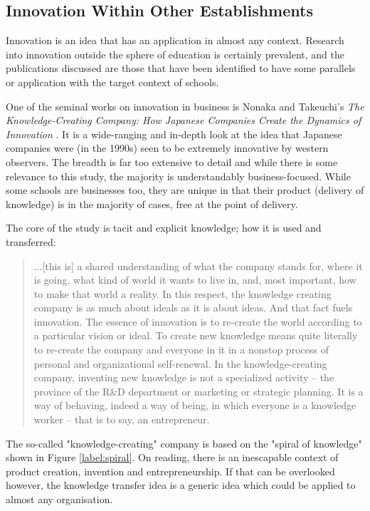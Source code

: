 \subsection{Innovation Within Other Establishments}
Innovation is an idea that has an application in almost any context. Research into innovation outside the sphere of education is certainly prevalent, and the publications discussed are those that have been identified to have some parallels or application with the target context of schools.

One of the seminal works on innovation in business is Nonaka and Takeuchi's \textit{The Knowledge-Creating Company: How Japanese Companies Create the Dynamics of Innovation} \citet{nonaka1995knowledge}. It is a wide-ranging and in-depth look at the idea that Japanese companies were (in the 1990s) seen to be extremely innovative by western observers. The breadth is far too extensive to detail and while there is some relevance to this study, the majority is understandably business-focused. While some schools are businesses too, they are unique in that their product (delivery of knowledge) is in the majority of cases, free at the point of delivery.

The core of the study is tacit and explicit knowledge; how it is used and transferred:

\begin{quote}
...[this is] a shared understanding of what the company stands for, where it is going, what kind of world it wants to live in, and, most important, how to make that world a reality. In this respect, the knowledge creating company is as much about ideals as it is about ideas. And that fact fuels innovation. The essence of innovation is to re-create the world according to a particular vision or ideal. To create new knowledge means quite literally to re-create the company and everyone in it in a nonstop process of personal and organizational self-renewal. In the knowledge-creating company, inventing new knowledge is not a specialized activity – the province of the R\&D department or marketing or strategic planning. It is a way of behaving, indeed a way of being, in which everyone is a knowledge worker – that is to say, an entrepreneur.
\end{quote}

The so-called "knowledge-creating" company is based on the "spiral of knowledge" shown in Figure \ref{label:spiral}. On reading, there is an inescapable context of product creation, invention and entrepreneurship. If that can be overlooked however, the knowledge transfer idea is a generic idea which could be applied to almost any organisation.

